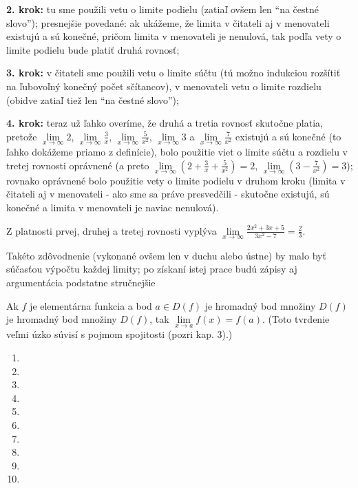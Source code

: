 \textbf{2. krok:}
tu sme použili vetu o limite podielu (zatiaľ ovšem len \enquote{na čestné
slovo}); presnejšie povedané: ak ukážeme, že limita v čitateli aj v menovateli
existujú a sú konečné, pričom limita v menovateli je nenulová, tak podľa vety o
limite podielu bude platiť druhá rovnosť;

\textbf{3. krok:}
v čitateli sme použili vetu o limite súčtu (tú možno indukciou rozšítiť na
ľubovoľný konečný počet sčítancov), v menovateli vetu o limite rozdielu (obidve
zatiaľ tiež len \enquote{na čestné slovo});

\textbf{4. krok:}
teraz už ľahko overíme, že druhá a tretia rovnosť skutočne platia, pretože
$\lim\limits_{x \rightarrow \infty} 2$,
$\lim\limits_{x \rightarrow \infty} \frac{3}{x}$,
$\lim\limits_{x \rightarrow \infty} \frac{5}{x^2}$,
$\lim\limits_{x \rightarrow \infty} 3$
a
$\lim\limits_{x \rightarrow \infty} \frac{7}{x^2}$
existujú a sú konečné (to ľahko dokážeme priamo z definície), bolo použitie viet
o limite súčtu a rozdielu v tretej rovnosti oprávnené (a preto $\lim\limits_{x
\rightarrow \infty} (2 + \frac{3}{x} + \frac{5}{x^2}) = 2$, $\lim\limits_{x
\rightarrow \infty} (3 - \frac{7}{x^2}) = 3$); rovnako oprávnené bolo použitie
vety o limite podielu v druhom kroku (limita v čitateli aj v menovateli - ako
sme sa práve presvedčili - skutočne existujú, sú konečné a limita v menovateli
je naviac nenulová).

Z platnosti prvej, druhej a tretej rovnosti vyplýva $\lim\limits_{x \rightarrow
\infty} \frac{2x^2 + 3x + 5}{3x^2 - 7} = \frac{2}{3}$.

Takéto zdôvodnenie (vykonané ovšem len v duchu alebo ústne) by malo byť súčasťou
výpočtu každej limity; po získaní istej prace budú zápisy aj argumentácia
podstatne stručnejšie

\begin{veta}
Ak $f$ je elementárna funkcia a bod $a \in D(f)$ je hromadný bod množiny $D(f)$
je hromadný bod množiny $D(f)$, tak $\lim\limits_{x \rightarrow a} f(x) = f(a)$.
(Toto tvrdenie veľmi úzko súvisí s pojmom spojitosti (pozri kap. 3).)
\end{veta}

\begin{enumerate}[resume]
  \item {}
  \item {}
  \item {}
  \item {}
  \item {}
  \item {}
  \item {}
  \item {}
  \item {}
  \item {}
\end{enumerate}


